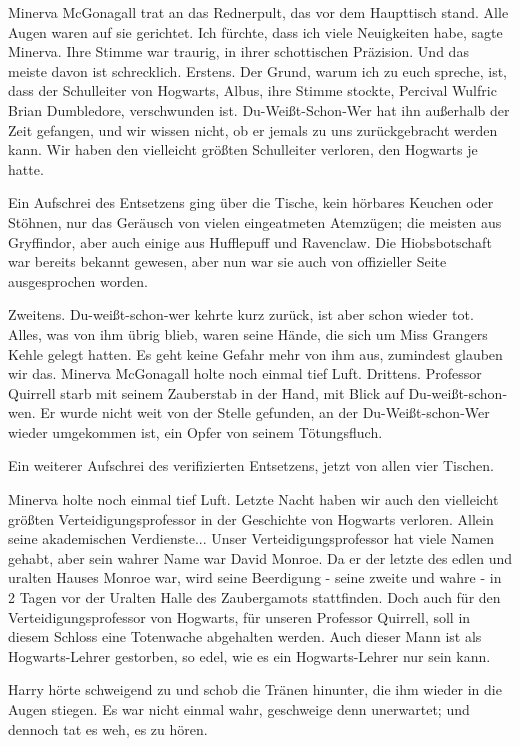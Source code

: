 Minerva McGonagall trat an das Rednerpult, das vor dem Haupttisch stand. Alle
Augen waren auf sie gerichtet. \glqq{}Ich fürchte, dass ich viele Neuigkeiten
habe\grqq{}, sagte Minerva. Ihre Stimme war traurig, in ihrer schottischen
Präzision. \glqq{}Und das meiste davon ist schrecklich. Erstens. Der Grund, warum
ich zu euch spreche, ist, dass der Schulleiter von Hogwarts, Albus\grqq{}, ihre
Stimme stockte, \glqq{}Percival Wulfric Brian Dumbledore, verschwunden ist.
Du-Weißt-Schon-Wer hat ihn außerhalb der Zeit gefangen, und wir wissen nicht, ob
er jemals zu uns zurückgebracht werden kann. Wir haben den vielleicht größten
Schulleiter verloren, den Hogwarts je hatte.\grqq{}

Ein Aufschrei des Entsetzens ging über die Tische, kein hörbares Keuchen oder
Stöhnen, nur das Geräusch von vielen eingeatmeten Atemzügen; die meisten aus
Gryffindor, aber auch einige aus Hufflepuff und Ravenclaw. Die Hiobsbotschaft
war bereits bekannt gewesen, aber nun war sie auch von offizieller Seite
ausgesprochen worden.

\glqq{}Zweitens. Du-weißt-schon-wer kehrte kurz zurück, ist aber schon wieder
tot. Alles, was von ihm übrig blieb, waren seine Hände, die sich um Miss
Grangers Kehle gelegt hatten. Es geht keine Gefahr mehr von ihm aus, zumindest
glauben wir das.\grqq{} Minerva McGonagall holte noch einmal tief Luft. \glqq{}
Drittens. Professor Quirrell starb mit seinem Zauberstab in der Hand, mit Blick
auf Du-weißt-schon-wen. Er wurde nicht weit von der Stelle gefunden, an der
Du-Weißt-schon-Wer wieder umgekommen ist, ein Opfer von seinem Tötungsfluch.\grqq{}

Ein weiterer Aufschrei des verifizierten Entsetzens, jetzt von allen vier
Tischen.

Minerva holte noch einmal tief Luft. \glqq{}Letzte Nacht haben wir auch den
vielleicht größten Verteidigungsprofessor in der Geschichte von Hogwarts
verloren. Allein seine akademischen Verdienste... Unser Verteidigungsprofessor
hat viele Namen gehabt, aber sein wahrer Name war David Monroe. Da er der letzte
des edlen und uralten Hauses Monroe war, wird seine Beerdigung - seine zweite
und wahre - in 2 Tagen vor der Uralten Halle des Zaubergamots stattfinden. Doch
auch für den Verteidigungsprofessor von Hogwarts, für unseren Professor
Quirrell, soll in diesem Schloss eine Totenwache abgehalten werden. Auch dieser
Mann ist als Hogwarts-Lehrer gestorben, so edel, wie es ein Hogwarts-Lehrer nur
sein kann.\grqq{}

Harry hörte schweigend zu und schob die Tränen hinunter, die ihm wieder in die
Augen stiegen. Es war nicht einmal wahr, geschweige denn unerwartet; und dennoch
tat es weh, es zu hören.

